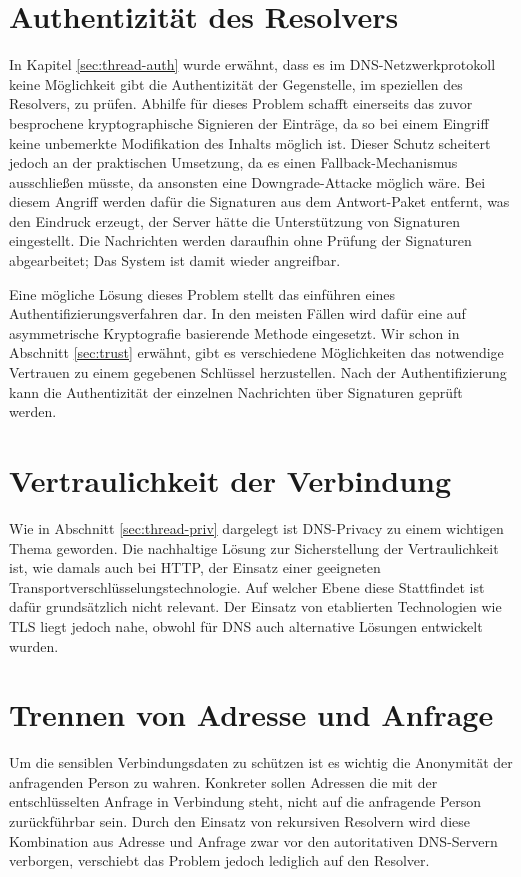 \section{Authentizität des Resolvers}
In Kapitel \ref{sec:thread-auth} wurde erwähnt, dass es im DNS-Netzwerkprotokoll keine Möglichkeit gibt die Authentizität der Gegenstelle, im speziellen des Resolvers, zu prüfen. Abhilfe für dieses Problem schafft einerseits das zuvor besprochene kryptographische Signieren der Einträge, da so bei einem Eingriff keine unbemerkte Modifikation des Inhalts möglich ist. Dieser Schutz scheitert jedoch an der praktischen Umsetzung, da es einen Fallback-Mechanismus ausschließen müsste, da ansonsten eine Downgrade-Attacke möglich wäre\cite{Bau2010}. Bei diesem Angriff werden dafür die Signaturen aus dem Antwort-Paket entfernt, was den Eindruck erzeugt, der Server hätte die Unterstützung von Signaturen eingestellt. Die Nachrichten werden daraufhin ohne Prüfung der Signaturen abgearbeitet; Das System ist damit wieder angreifbar. 

Eine mögliche Lösung dieses Problem stellt das einführen eines Authentifizierungsverfahren dar. In den meisten Fällen wird dafür eine auf asymmetrische Kryptografie basierende Methode eingesetzt. Wir schon in Abschnitt \ref{sec:trust} erwähnt, gibt es verschiedene Möglichkeiten das notwendige Vertrauen zu einem gegebenen Schlüssel herzustellen. Nach der Authentifizierung kann die Authentizität der einzelnen Nachrichten über Signaturen geprüft werden.

\section{Vertraulichkeit der Verbindung}
Wie in Abschnitt \ref{sec:thread-priv} dargelegt ist DNS-Privacy zu einem wichtigen Thema geworden. Die nachhaltige Lösung zur Sicherstellung der Vertraulichkeit ist, wie damals auch bei HTTP, der Einsatz einer geeigneten Transportverschlüsselungstechnologie. Auf welcher Ebene diese Stattfindet ist dafür grundsätzlich nicht relevant. Der Einsatz von etablierten Technologien wie TLS liegt jedoch nahe, obwohl für DNS auch alternative Lösungen entwickelt wurden. 

\section{Trennen von Adresse und Anfrage}
\label{sec:goals-sourceanon}
Um die sensiblen Verbindungsdaten zu schützen ist es wichtig die Anonymität der anfragenden Person zu wahren. Konkreter sollen Adressen die mit der entschlüsselten Anfrage in Verbindung steht, nicht auf die anfragende Person zurückführbar sein. Durch den Einsatz von rekursiven Resolvern wird diese Kombination aus Adresse und Anfrage zwar vor den autoritativen DNS-Servern verborgen, verschiebt das Problem jedoch lediglich auf den Resolver. 

